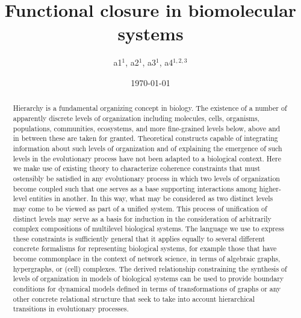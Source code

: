 \documentclass[aps,twocolumn]{revtex4-1}
\begin{document}
 

\title{\bf Functional closure in biomolecular systems}

\author{a1$^{1}$, a2$^{1}$, a3$^{1}$, a4$^{1,2,3}$}


\date{\today}
\begin{abstract}
Hierarchy is a fundamental organizing concept in biology. The existence of a number of apparently discrete levels of organization including molecules, cells, organisms, populations, communities, ecosystems, and more fine-grained levels below, above and in between these are taken for granted. Theoretical constructs capable of integrating information about such levels of organization and of explaining the emergence of such levels in the evolutionary process have not been adapted to a biological context. Here we make use of existing theory to characterize coherence constraints that must ostensibly be satisfied in any evolutionary process in which two levels of organization become coupled such that one serves as a base supporting interactions among higher-level entities in another. In this way, what may be considered as two distinct levels may come to be viewed as part of a unified system. This process of unification of distinct levels may serve as a basis for induction in the consideration of arbitrarily complex compositions of multilevel biological systems. The language we use to express these constraints is sufficiently general that it applies equally to several different concrete formalisms for representing biological systems, for example those that have become commonplace in the context of network science, in terms of algebraic graphs, hypergraphs, or (cell) complexes. The derived relationship constraining the synthesis of levels of organization in models of biological systems can be used to provide boundary conditions for dynamical models defined in terms of transformations of graphs or any other concrete relational structure that seek to take into account hierarchical transitions in evolutionary processes.
\end{abstract}

\maketitle
\end{document}

